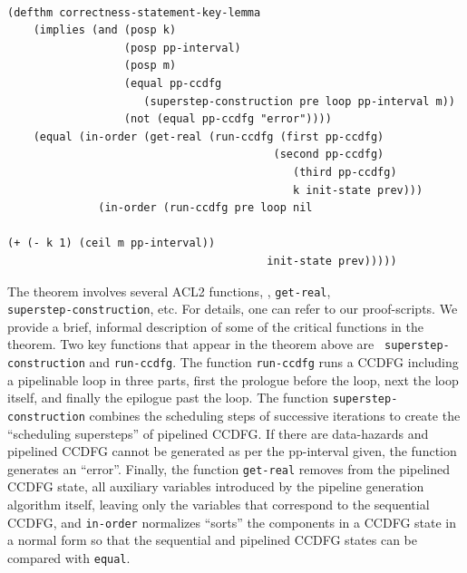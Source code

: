 \small
\begin{verbatim}
    
(defthm correctness-statement-key-lemma
    (implies (and (posp k)
                  (posp pp-interval)
                  (posp m)
                  (equal pp-ccdfg 
                     (superstep-construction pre loop pp-interval m))
                  (not (equal pp-ccdfg "error"))))
    (equal (in-order (get-real (run-ccdfg (first pp-ccdfg) 
                                         (second pp-ccdfg) 
                            	            (third pp-ccdfg) 
                            	            k init-state prev)))
              (in-order (run-ccdfg pre loop nil 
								               		                  (+ (- k 1) (ceil m pp-interval)) 
                                 		init-state prev)))))
\end{verbatim}
\normalsize

The theorem involves several ACL2 functions, \eg,
{\tt get-real}, \\ {\tt superstep-construction}, etc. 
For details, one can
  refer to our proof-scripts. 
We provide a brief, informal
description of some of the critical functions in the theorem.
Two key functions that appear in the theorem above are {\tt
  superstep-construction} and {\tt run-ccdfg}. The function {\tt run-ccdfg} runs a CCDFG including a
pipelinable loop in three parts, first the prologue before the
loop, next the loop itself, and finally the epilogue past the
loop.
The function {\tt superstep-construction} combines the scheduling steps of successive iterations to create the ``scheduling supersteps'' of pipelined CCDFG.  If there are data-hazards and pipelined CCDFG cannot be generated as per
the pp-interval given, the function generates an ``error''.
Finally, the function {\tt get-real} removes from the
pipelined CCDFG state, all auxiliary variables introduced by
the pipeline generation algorithm itself, leaving only the
variables that correspond to the sequential
CCDFG,
and {\tt in-order} normalizes ``sorts'' the
components in a CCDFG state in a normal form so that the
sequential and pipelined CCDFG states can be compared with
{\tt equal}.

